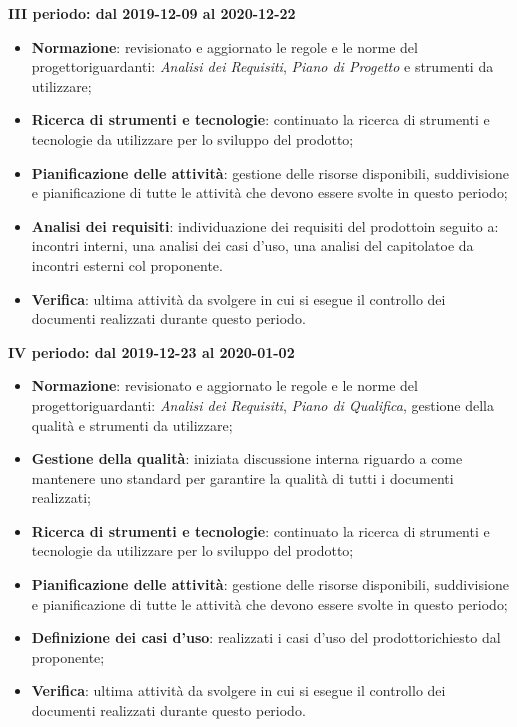 \textbf{III periodo: dal 2019-12-09 al 2020-12-22}
\begin{itemize}
	\item \textbf{Normazione}: revisionato e aggiornato le regole e le norme del progetto\glosp riguardanti: \textit{Analisi dei Requisiti}, \textit{Piano di Progetto} e strumenti da utilizzare;
	\item \textbf{Ricerca di strumenti e tecnologie}: continuato la ricerca di strumenti e tecnologie da utilizzare per lo sviluppo del prodotto\glo;
	\item \textbf{Pianificazione delle attività}: gestione delle risorse disponibili, suddivisione e pianificazione di tutte le attività che devono essere svolte in questo periodo;
	\item \textbf{Analisi dei requisiti}: individuazione dei requisiti del prodotto\glosp in seguito a: incontri interni, una analisi dei casi d'uso, una analisi del capitolato\glosp e da incontri esterni col proponente.
	\item \textbf{Verifica}: ultima attività da svolgere in cui si esegue il controllo dei documenti realizzati durante questo periodo.
\end{itemize}

\textbf{IV periodo: dal 2019-12-23 al 2020-01-02}
\begin{itemize}
	\item \textbf{Normazione}: revisionato e aggiornato le regole e le norme del progetto\glosp riguardanti: \textit{Analisi dei Requisiti}, \textit{Piano di Qualifica}, gestione della qualità e strumenti da utilizzare;
	\item \textbf{Gestione della qualità}: iniziata discussione interna riguardo a come mantenere uno standard per garantire la qualità di tutti i documenti realizzati;
	\item \textbf{Ricerca di strumenti e tecnologie}: continuato la ricerca di strumenti e tecnologie da utilizzare per lo sviluppo del prodotto\glo;
	\item \textbf{Pianificazione delle attività}: gestione delle risorse disponibili, suddivisione e pianificazione di tutte le attività che devono essere svolte in questo periodo;
	\item \textbf{Definizione dei casi d'uso}: realizzati i casi d'uso del prodotto\glosp richiesto dal proponente;
	\item \textbf{Verifica}: ultima attività da svolgere in cui si esegue il controllo dei documenti realizzati durante questo periodo.
\end{itemize}


